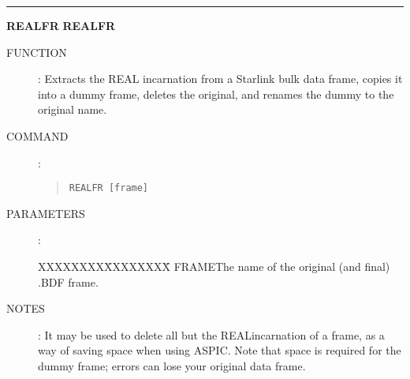 \goodbreak
\rule{\textwidth}{0.3mm}
{\Large {\bf REALFR} \hfill {\bf REALFR}}
\begin{description}
\item [FUNCTION]:
Extracts the REAL incarnation from a Starlink bulk data frame, copies it into a
dummy frame, deletes the original, and renames the dummy to the original name.
\item [COMMAND]:
\begin{quote}
{\tt REALFR [frame]}
\end{quote}
\item [PARAMETERS] :
\begin{tabbing}
XXXXXXXX\=XXXXXXXX\=\kill
FRAME\>\>The name of the original (and final) .BDF frame.
\end{tabbing}
\item [NOTES]:
It may be used to delete all but the REALincarnation of a frame, as a way of
saving space when using ASPIC.
Note that space is required for the dummy frame; errors can lose your original
data frame.
\end{description}

